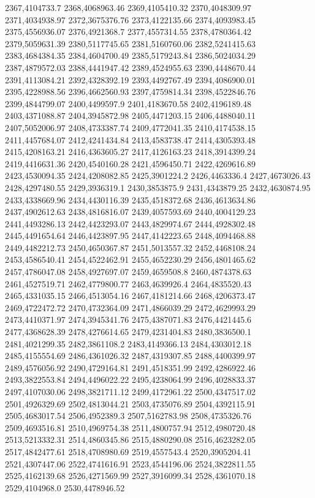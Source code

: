 2367,4104733.7
2368,4068963.46
2369,4105410.32
2370,4048309.97
2371,4034938.97
2372,3675376.76
2373,4122135.66
2374,4093983.45
2375,4556936.07
2376,4921368.7
2377,4557314.55
2378,4780364.42
2379,5059631.39
2380,5117745.65
2381,5160760.06
2382,5241415.63
2383,4684384.35
2384,4604700.49
2385,5179243.84
2386,5024034.29
2387,4879572.03
2388,4441947.42
2389,4524955.63
2390,4448670.44
2391,4113084.21
2392,4328392.19
2393,4492767.49
2394,4086900.01
2395,4228988.56
2396,4662560.93
2397,4759814.34
2398,4522846.76
2399,4844799.07
2400,4499597.9
2401,4183670.58
2402,4196189.48
2403,4371088.87
2404,3945872.98
2405,4471203.15
2406,4488040.11
2407,5052006.97
2408,4733387.74
2409,4772041.35
2410,4174538.15
2411,4457684.07
2412,4241434.84
2413,4583738.47
2414,4305393.48
2415,4208163.21
2416,4363605.27
2417,4126163.23
2418,3914399.24
2419,4416631.36
2420,4540160.28
2421,4596450.71
2422,4269616.89
2423,4530094.35
2424,4208082.85
2425,3901224.2
2426,4463336.4
2427,4673026.43
2428,4297480.55
2429,3936319.1
2430,3853875.9
2431,4343879.25
2432,4630874.95
2433,4338669.96
2434,4430116.39
2435,4518372.68
2436,4613634.86
2437,4902612.63
2438,4816816.07
2439,4057593.69
2440,4004129.23
2441,4493286.13
2442,4423293.07
2443,4829974.67
2444,4928302.48
2445,4491654.64
2446,4423897.95
2447,4142223.65
2448,4094468.88
2449,4482212.73
2450,4650367.87
2451,5013557.32
2452,4468108.24
2453,4586540.41
2454,4522462.91
2455,4652230.29
2456,4801465.62
2457,4786047.08
2458,4927697.07
2459,4659508.8
2460,4874378.63
2461,4527519.71
2462,4779800.77
2463,4639926.4
2464,4835520.43
2465,4331035.15
2466,4513054.16
2467,4181214.66
2468,4206373.47
2469,4722472.72
2470,4732364.09
2471,4866039.29
2472,4629993.29
2473,4410371.97
2474,3945341.76
2475,4387071.83
2476,4421445.6
2477,4368628.39
2478,4276614.65
2479,4231404.83
2480,3836500.1
2481,4021299.35
2482,3861108.2
2483,4149366.13
2484,4303012.18
2485,4155554.69
2486,4361026.32
2487,4319307.85
2488,4400399.97
2489,4576056.92
2490,4729164.81
2491,4518351.99
2492,4286922.46
2493,3822553.84
2494,4496022.22
2495,4238064.99
2496,4028833.37
2497,4107030.06
2498,3821711.12
2499,4172961.22
2500,4347517.02
2501,4926329.69
2502,4813044.21
2503,4735076.89
2504,4392115.91
2505,4683017.54
2506,4952389.3
2507,5162783.98
2508,4735326.76
2509,4693516.81
2510,4969754.38
2511,4800757.94
2512,4980720.48
2513,5213332.31
2514,4860345.86
2515,4880290.08
2516,4623282.05
2517,4842477.61
2518,4708980.69
2519,4557543.4
2520,3905204.41
2521,4307447.06
2522,4741616.91
2523,4544196.06
2524,3822811.55
2525,4162139.68
2526,4271569.99
2527,3916099.34
2528,4361070.18
2529,4104968.0
2530,4478946.52
